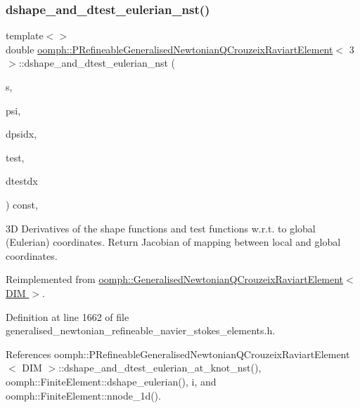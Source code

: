 \subsubsection{\texorpdfstring{dshape\+\_\+and\+\_\+dtest\+\_\+eulerian\+\_\+nst()}{dshape\_and\_dtest\_eulerian\_nst()}\hspace{0.1cm}{\footnotesize\ttfamily [3/3]}}
{\footnotesize\ttfamily template$<$$>$ \\
double \hyperlink{classoomph_1_1PRefineableGeneralisedNewtonianQCrouzeixRaviartElement}{oomph\+::\+P\+Refineable\+Generalised\+Newtonian\+Q\+Crouzeix\+Raviart\+Element}$<$ 3 $>$\+::dshape\+\_\+and\+\_\+dtest\+\_\+eulerian\+\_\+nst (\begin{DoxyParamCaption}\item[{const \hyperlink{classoomph_1_1Vector}{Vector}$<$ double $>$ \&}]{s,  }\item[{\hyperlink{classoomph_1_1Shape}{Shape} \&}]{psi,  }\item[{\hyperlink{classoomph_1_1DShape}{D\+Shape} \&}]{dpsidx,  }\item[{\hyperlink{classoomph_1_1Shape}{Shape} \&}]{test,  }\item[{\hyperlink{classoomph_1_1DShape}{D\+Shape} \&}]{dtestdx }\end{DoxyParamCaption}) const\hspace{0.3cm}{\ttfamily [inline]}, {\ttfamily [virtual]}}

3D Derivatives of the shape functions and test functions w.\+r.\+t. to global (Eulerian) coordinates. Return Jacobian of mapping between local and global coordinates. 

Reimplemented from \hyperlink{classoomph_1_1GeneralisedNewtonianQCrouzeixRaviartElement_a815dca7d5b556835865c7691e547bc37}{oomph\+::\+Generalised\+Newtonian\+Q\+Crouzeix\+Raviart\+Element$<$ D\+I\+M $>$}.



Definition at line 1662 of file generalised\+\_\+newtonian\+\_\+refineable\+\_\+navier\+\_\+stokes\+\_\+elements.\+h.



References oomph\+::\+P\+Refineable\+Generalised\+Newtonian\+Q\+Crouzeix\+Raviart\+Element$<$ D\+I\+M $>$\+::dshape\+\_\+and\+\_\+dtest\+\_\+eulerian\+\_\+at\+\_\+knot\+\_\+nst(), oomph\+::\+Finite\+Element\+::dshape\+\_\+eulerian(), i, and oomph\+::\+Finite\+Element\+::nnode\+\_\+1d().

\mbox{\label{classoomph_1_1PRefineableGeneralisedNewtonianQCrouzeixRaviartElement_aad3e0f421f695de35837393b7520d05a}} 
